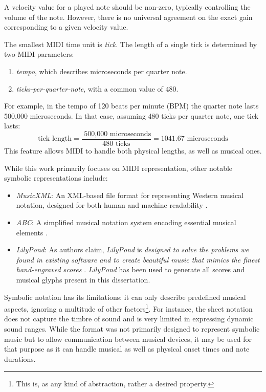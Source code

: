 A velocity value for a played note should be non-zero, typically controlling the volume of the note. However, there is no universal agreement on the exact gain corresponding to a given velocity value.

The smallest MIDI time unit is \emph{tick}. The length of a single tick is determined by two MIDI parameters:
\begin{enumerate}
	\item \emph{tempo}, which describes microseconds per quarter note.
	\item \emph{ticks-per-quarter-note}, with a common value of $480$.
\end{enumerate}

For example, in the tempo of 120 beats per minute (BPM) the quarter note lasts 500,000 microseconds. In that case, assuming 480 ticks per quarter note, one tick lasts: \[\textrm{tick length} = \frac{\text{ 500,000 microseconds}}{\text{480 ticks}} = 1041.67 \text{ microseconds}\] This feature allows MIDI to handle both physical lengths, as well as musical ones.

While this work primarily focuses on MIDI representation, other notable symbolic representations include:
\begin{itemize}
   \item \emph{MusicXML}: An XML-based file format for representing Western musical notation, designed for both human and machine readability \cite{Good2001}.
   \item \emph{ABC}: A simplified musical notation system encoding essential musical elements \cite{ABC2013}.
   \item \emph{LilyPond}: As authors claim, \emph{LilyPond} is \emph{designed to solve the problems we found in existing software and to create beautiful music that mimics the finest hand-engraved scores} \cite{LilyPond2002}. \emph{LilyPond} has been used to generate all scores and musical glyphs present in this dissertation.
\end{itemize}

Symbolic notation has its limitations: it can only describe predefined musical aspects, ignoring a multitude of other factors\footnote{This is, as any kind of abstraction, rather a desired property.}. For instance, the sheet notation does not capture the timbre of sound and is very limited in expressing dynamic sound ranges. While the format was not primarily designed to represent symbolic music but to allow communication between musical devices, it may be used for that purpose as it can handle 	musical as well as physical onset times and note durations\cite{Grohganz2014}.

